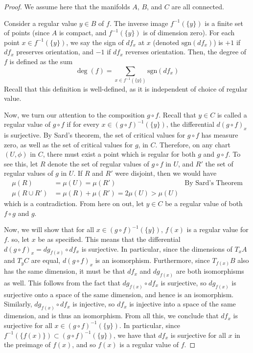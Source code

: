 \documentclass[fontsize=11pt]{scrartcl} %
\numberwithin{equation}{section} %
\numberwithin{figure}{section} %
\numberwithin{table}{section} %
\newcommand{\sgn}{\text{sgn}}
\begin{document}
\begin{proof}
    We assume here that the manifolds $A$, $B$, and $C$ are all connected.

    Consider a regular value $y\in B$ of $f$. The inverse image $f^{-1}(\{y\})$
    is a finite set of points (since $A$ is compact, and $f^{-1}(\{y\})$ is of
    dimension zero). For each point $x\in f^{-1}(\{y\})$, we say the sign of
    $df_x$ at $x$ (denoted $\sgn(df_x)$) is $+1$ if $df_x$ preserves
    orientation, and $-1$ if $df_x$ reverses orientation. Then, the degree of
    $f$ is defined as the sum
    \[
        \deg(f) = \sum_{x\in f^{-1}(\{y\})}\sgn(df_x)
    \]
    Recall that this definition is well-defined, as it is independent of choice
    of regular value.

    Now, we turn our attention to the composition $g\circ f$. Recall that $y\in
    C$ is called a regular value of $g\circ f$ if for every $x\in (g\circ
    f)^{-1}(\{y\})$, the differential $d(g\circ f)_x$ is surjective. By
    Sard's theorem, the set of critical values for $g\circ f$ has measure zero,
    as well as the set of critical values for $g$, in $C$. Therefore, on any
    chart $(U,\phi)$ in $C$, there must exist a point which is regular for both
    $g$ and $g\circ f$. To see this, let $R$ denote the set of regular values of
    $g\circ f$ in $U$, and $R'$ the set of regular values of $g$ in $U$. If $R$
    and $R'$ were disjoint, then we would have
    \[
        \begin{aligned}
            \mu(R) &= \mu(U) = \mu(R') &\text{By Sard's Theorem}\\
            \mu(R\cup R') &= \mu(R)+\mu(R')=2\mu(U)>\mu(U)
        \end{aligned}
    \]
    which is a contradiction. From here on out, let $y\in C$ be a regular value
    of both $f\circ g$ and $g$.

    Now, we will show that for all $x\in (g\circ f)^{-1}(\{y\})$, $f(x)$ is a
    regular value for $f$. so, let $x$ be as specified.
     This means that the differential $d(g\circ f)_x
    = dg_{f(x)}\circ df_x$ is surjective. In particular, since the dimensions of
    $T_xA$ and $T_yC$ are equal, $d(g\circ f)_x$ is an isomorphism. Furthermore,
    since $T_{f(x)}B$ also has the same dimension, it must be that $df_x$ and
    $dg_{f(x)}$ are both isomorphisms as well. This follows from the fact that
    $dg_{f(x)}\circ df_x$ is surjective, so $dg_{f(x)}$ is surjective onto a
    space of the same dimension, and hence is an isomorphism. Similarly,
    $dg_{f(x)}\circ df_x$ is injective, so $df_x$ is injective into a space of
    the same dimension, and is thus an isomorphism. From all this, we conclude
    that $df_x$ is surjective for all $x\in (g\circ f)^{-1}(\{y\})$. In
    particular, since $f^{-1}(\{f(x)\})\subset (g\circ f)^{-1}(\{y\})$, we have
    that $df_x$ is surjective for all $x$ in the preimage of $f(x)$, and so
    $f(x)$ is a regular value of $f$.


\end{proof}
\end{document}

